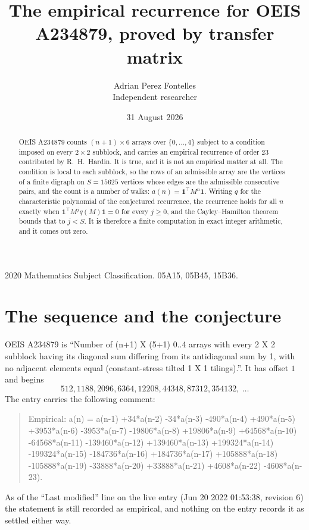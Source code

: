 \documentclass[11pt,a4paper]{article}
\title{The empirical recurrence for OEIS A234879, proved by transfer matrix}
\author{Adrian Perez Fontelles\\ \small Independent researcher}
\date{31 August 2026}
\theoremstyle{plain}
\theoremstyle{definition}
\begin{document}
\maketitle

\begin{abstract}
OEIS A234879 counts $(n+1)\times6$ arrays over $\{0,\dots,4\}$ subject to a condition imposed on
every $2\times2$ subblock, and carries an empirical recurrence of order $23$ contributed
by R.~H.~Hardin. It is true, and it is not an empirical matter at all. The condition is local
to each subblock, so the rows of an admissible array are the vertices of a finite digraph
on $S=15625$ vertices whose edges are the admissible consecutive pairs, and the count is a
number of walks: $a(n)=\mathbf{1}^{\!\top}M^{n}\mathbf{1}$. Writing $q$
for the characteristic polynomial of the conjectured recurrence, the recurrence holds for all
$n$ exactly when $\mathbf{1}^{\!\top}M^{j}q(M)\mathbf{1}=0$ for every $j\ge0$, and the
Cayley--Hamilton theorem bounds that to $j<S$. It is therefore a finite computation in exact
integer arithmetic, and it comes out zero.
\end{abstract}

\noindent\small 2020 Mathematics Subject Classification. 05A15, 05B45, 15B36.\normalsize

\section{The sequence and the conjecture}

OEIS A234879 is ``Number of (n+1) X (5+1) 0..4 arrays with every 2 X 2 subblock having its diagonal sum differing from its antidiagonal sum by 1, with no adjacent elements equal (constant-stress tilted 1 X 1 tilings).''. It has offset $1$ and begins
\[
512, 1188, 2096, 6364, 12208, 44348, 87312, 354132,\ \dots
\]
The entry carries the following comment:
\begin{quote}\small
Empirical: a(n) = a(n-1) +34*a(n-2) -34*a(n-3) -490*a(n-4) +490*a(n-5) +3953*a(n-6) -3953*a(n-7) -19806*a(n-8) +19806*a(n-9) +64568*a(n-10) -64568*a(n-11) -139460*a(n-12) +139460*a(n-13) +199324*a(n-14) -199324*a(n-15) -184736*a(n-16) +184736*a(n-17) +105888*a(n-18) -105888*a(n-19) -33888*a(n-20) +33888*a(n-21) +4608*a(n-22) -4608*a(n-23).
\end{quote}
As of the ``Last modified'' line on the live entry (Jun 20 2022 01:53:38, revision 6) the statement is
still recorded as empirical, and nothing on the entry records it as settled either way.
\end{document}
